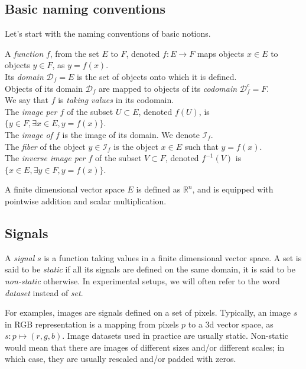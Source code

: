 \documentclass{article}
\newcommand{\domain}{\mathcal{D}}
\newcommand{\image}{\mathcal{I}}
\newcommand{\real}{\mathbb{R}}
\begin{document}
\subsection*{Basic naming conventions}

Let's start with the naming conventions of basic notions.

A \emph{function} $f$, from the set $E$ to $F$, denoted $f: E \rightarrow F$ maps objects $x \in E$ to objects $y \in F$, as $y = f(x)$.\\
Its \emph{domain} $\domain_f = E$ is the set of objects onto which it is defined.\\
Objects of its domain $\domain_f$ are mapped to objects of its \emph{codomain} $\domain_f^c= F$.\\
We say that $f$ is \emph{taking values} in its codomain.\\
The \emph{image per $f$} of the subset $U \subset E$, denoted $f(U)$, is $\{y \in F, \exists x \in E, y = f(x)\}$.\\
The \emph{image of $f$} is the image of its domain. We denote $\image_f$.\\
The \emph{fiber} of the object $y \in \image_f$ is the object $x \in E$ such that $y = f(x)$.\\
The \emph{inverse image per $f$} of the subset $V \subset F$, denoted $f^{-1}(V)$ is $\{x \in E, \exists y \in F, y = f(x)\}$.

A finite dimensional vector space $E$ is defined as $\real^n$, and is equipped with pointwise addition and scalar multiplication. %

\subsection*{Signals}

A \emph{signal} $s$ is a function taking values in a finite dimensional vector space.
A set is said to be \emph{static} if all its signals are defined on the same domain, it is said to be \emph{non-static} otherwise.
In experimental setups, we will often refer to the word \emph{dataset} instead of \emph{set}.

For examples, images are signals defined on a set of pixels. Typically, an image $s$ in RGB representation is a mapping from pixels $p$ to a 3d vector space, as $s: p \mapsto (r,g,b)$. Image datasets used in practice are usually static. Non-static would mean that there are images of different sizes and/or different scales; in which case, they are usually rescaled and/or padded with zeros.
\end{document}
